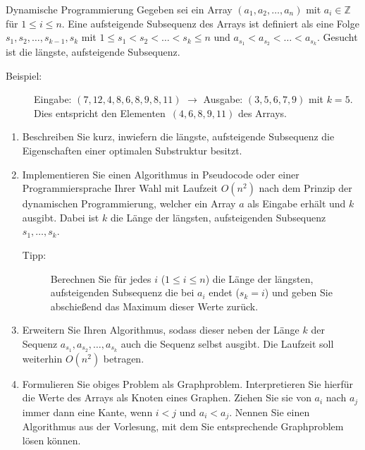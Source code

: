 \documentclass[11pt,a4paper]{article}
\begin{document}
\begin{aufgabe}{3}{Dynamische Programmierung}
    Gegeben sei ein Array $(a_1, a_2, \ldots, a_n)$ mit $a_i \in \mathbb{Z}$ für $1 \leq i \leq n$.
    Eine aufsteigende Subsequenz des Arrays ist definiert als eine Folge $s_1, s_2, \ldots, s_{k - 1}, s_k$ mit $1 \leq s_1 < s_2 < \ldots < s_k \leq n$ und $a_{s_1} < a_{s_2} < \ldots < a_{s_k}$.
    Gesucht ist die längste, aufsteigende Subsequenz.
    \begin{description}
        \item[Beispiel:] Eingabe: $(7, 12, 4, 8, 6, 8, 9, 8, 11)$ $\rightarrow$ Ausgabe: $(3, 5, 6, 7, 9)$ mit $k = 5$. Dies entspricht den Elementen~$(4, 6, 8, 9, 11)$ des Arrays.
    \end{description}
    \begin{enumerate}[label=\alph*)]
        \item\label{optimal_substructure} Beschreiben Sie kurz, inwiefern die längste, aufsteigende Subsequenz die Eigenschaften einer optimalen Substruktur besitzt.
        \item\label{dynamic} Implementieren Sie einen Algorithmus in Pseudocode oder einer Programmiersprache Ihrer Wahl mit Laufzeit $O(n^2)$ nach dem Prinzip der dynamischen Programmierung, welcher ein Array $a$ als Eingabe erhält und $k$ ausgibt.
        Dabei ist $k$ die Länge der längsten, aufsteigenden Subsequenz $s_1, \ldots, s_k$.
        \begin{description}
            \item[Tipp:] Berechnen Sie für jedes $i$ ($1 \leq i \leq n$) die Länge der längsten, aufsteigenden Subsequenz die bei $a_i$ endet ($s_k = i$) und geben Sie abschießend das Maximum dieser Werte zurück.
        \end{description}
        \item Erweitern Sie Ihren Algorithmus, sodass dieser neben der Länge $k$ der Sequenz $a_{s_1}, a_{s_2}, \ldots, a_{s_k}$ auch die Sequenz selbst ausgibt.
        Die Laufzeit soll weiterhin $O(n^2)$ betragen.
        \item
        Formulieren Sie obiges Problem als Graphproblem.
        Interpretieren Sie hierfür die Werte des Arrays als Knoten eines Graphen.
        Ziehen Sie sie von $a_i$ nach $a_j$ immer dann eine Kante, wenn $i < j$ und $a_i < a_j$.
        Nennen Sie einen Algorithmus aus der Vorlesung, mit dem Sie entsprechende Graphproblem lösen können.
    \end{enumerate}
\end{aufgabe}
\end{document}
